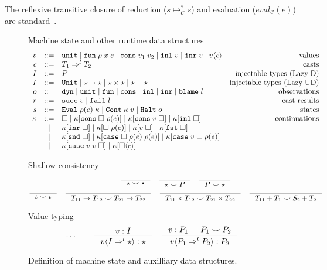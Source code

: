 \documentclass[acmsmall,review,anonymous]{acmart}\settopmatter{printfolios=true,printccs=false,printacmref=false}
\newcommand{\stxrule}[3]{#1 & ::= & #3 & \text{#2}\\}
\newcommand{\stxrulecont}[1]{& | & #1 & \\}
\newcommand{\plus}[0]{+}
\newcommand{\lazyUD}{Lazy\;UD}
\newcommand{\lazyD}{Lazy\;D}
\newcommand{\sOOinspect}[3]{\mathtt{Eval} \; #2(#1) \; #3}
\newcommand{\sOOreturn}[2]{\mathtt{Cont} \; #2 \; #1}
\newcommand{\sOOhalt}[1]{\mathtt{Halt} \; #1}
\newcommand{\TOOdyn}[0]{\star}
\newcommand{\POOunit}[0]{\mathtt{Unit}}
\newcommand{\POOfun}[2]{#1 \shortrightarrow #2}
\newcommand{\cOOcast}[3]{#1 \Rightarrow^{#2} #3}
\newcommand{\oOOinj}{\mathtt{dyn}}
\newcommand{\oOOsole}{\mathtt{unit}}
\newcommand{\oOOfun}{\mathtt{fun}}
\newcommand{\oOOcons}{\mathtt{cons}}
\newcommand{\oOOinl}{\mathtt{inl}}
\newcommand{\oOOinr}{\mathtt{inr}}
\newcommand{\oOOblame}[1]{\mathtt{blame} \; #1}
\newcommand{\vOOcast}[2]{#1\langle#2\rangle}
\newcommand{\vOOfun}[3]{\mathtt{fun} \; #1 \; #2 \; #3}
\newcommand{\vOOtt}[0]{\mathtt{unit}}
\newcommand{\vOOcons}[2]{\mathtt{cons}\;#1\;#2}
\newcommand{\vOOinl}[1]{\mathtt{inl}\;#1}
\newcommand{\vOOinr}[1]{\mathtt{inr}\;#1}
\newcommand{\rOOsucc}[1]{\mathtt{succ}\;#1}
\newcommand{\rOOfail}[1]{\mathtt{fail}\;#1}
\newcommand{\kOOmt}[0]{\square}
\newcommand{\kOOconsI}[3]{#3[\mathtt{cons} \; \square \; #2(#1) ]}
\newcommand{\kOOconsII}[2]{#2[\mathtt{cons} \; #1 \; \square]}
\newcommand{\kOOinl}[1]{#1[\mathtt{inl} \; \square]}
\newcommand{\kOOinr}[1]{#1[\mathtt{inr} \; \square]}
\newcommand{\kOOappI}[3]{
	#3[\square \; #2(#1) ]
}
\newcommand{\kOOappII}[2]{
	#2[#1 \; \square]}
\newcommand{\kOOcar}[1]{#1[\mathtt{fst} \; \square]}
\newcommand{\kOOcdr}[1]{#1[\mathtt{snd} \; \square]}
\newcommand{\kOOcaseI}[4]{
	#4[\mathtt{case} \; \square \; #3(#1) \; #3(#2) ]}
\newcommand{\kOOcaseII}[4]{
	#4[\mathtt{case} \; #1 \; \square \; #3(#2) ]}
\newcommand{\kOOcaseIII}[3]{
	#3[\mathtt{case} \; #1 \; #2 \; \square]}
\newcommand{\kOOcast}[2]{
	#2[\square \langle #1 \rangle]}
\newcommand{\judgeCreduceTrans}[2]{#1 \longmapsto_{\mathcal{C}}^{*} #2}
\begin{document}
The reflexive transitive closure of reduction ($
\judgeCreduceTrans{s}{s} $) and evaluation ($ eval_\mathcal{C}(e) $)
are standard~\citep{felleisen03:_pllc}.


\begin{figure}
  Machine state and other runtime data structures
  \[
  \begin{array}{rclr}
	\stxrule{v}{values}{
		\vOOtt{} \mid
		\vOOfun{\rho}{x}{e} \mid
		\vOOcons{v_1}{v_2} \mid
		\vOOinl{v} \mid
		\vOOinr{v} \mid		
		\vOOcast{v}{c}
	}
	\stxrule{c}{casts}{
		\cOOcast{T_1}{l}{T_2}
	}
	\stxrule{I}{injectable types (\lazyD)}{
		P
	}
	\stxrule{I}{injectable types (\lazyUD)}{
		\POOunit \mid
		\POOfun{\star}{\star} \mid
		\star \times \star \mid
		\star + \star
	}
	\stxrule{o}{observations}{
		\oOOinj \mid
		\oOOsole \mid
		\oOOfun \mid
		\oOOcons \mid
		\oOOinl \mid
		\oOOinr \mid
		\oOOblame{l}
	}
	\stxrule{r}{cast results}{
		\rOOsucc{v} \mid
		\rOOfail{l}
	}
	\stxrule{s}{states}{
		\sOOinspect{e}{\rho}{\kappa} \mid{}
		\sOOreturn{v}{\kappa} \mid{}
		\sOOhalt{o}
	}
	\stxrule{\kappa}{continuations}{
		\kOOmt \mid
		\kOOconsI{e}{\rho}{\kappa} \mid
		\kOOconsII{v}{\kappa} \mid
		\kOOinl{\kappa}
	}
	\stxrulecont{
		\kOOinr{\kappa} \mid
		\kOOappI{e}{\rho}{\kappa} \mid
		\kOOappII{v}{\kappa} \mid
		\kOOcar{\kappa}
	}
	\stxrulecont{	
		\kOOcdr{\kappa}\mid
		\kOOcaseI{e}{e}{\rho}{\kappa}\mid
		\kOOcaseII{v}{e}{\rho}{\kappa}
	}
	\stxrulecont{
		\kOOcaseIII{v}{v}{\kappa} \mid
		\kOOcast{c}{\kappa}
	}
  \end{array}
  \]

        Shallow-consistency
	\begin{gather*}
	\inference{}{
		\star \smile \star
	} \quad
	\inference{}{
		\star \smile P
	} \quad
	\inference{}{
		P \smile \star
	} \\
	\inference{}{
		\iota \smile \iota
	} \quad
	\inference{}{
		T_{11} \rightarrow T_{12} \smile T_{21} \rightarrow T_{22}
	} \quad
	\inference{}{
		T_{11} \times T_{12} \smile T_{21} \times T_{22}
	} \quad
	\inference{}{
	T_{11} \plus T_1 \smile S_2 \plus T_2
	}
	\end{gather*}
	
	Value typing 
	\begin{gather*}
	\dots \qquad
	\inference{
		v : I
	}{
		\vOOcast{v}{\cOOcast{I}{l}{\TOOdyn}} : \TOOdyn
	}
	\quad
	\inference{
		v : P_1 &
		P_1 \smile P_2
	}{
		\vOOcast{v}{\cOOcast{P_1}{l}{P_2}} : P_2
	}
	\end{gather*}
        \caption{Definition of machine state and auxilliary data
          structures.}
        \label{fig:state}
\end{figure}
\end{document}
